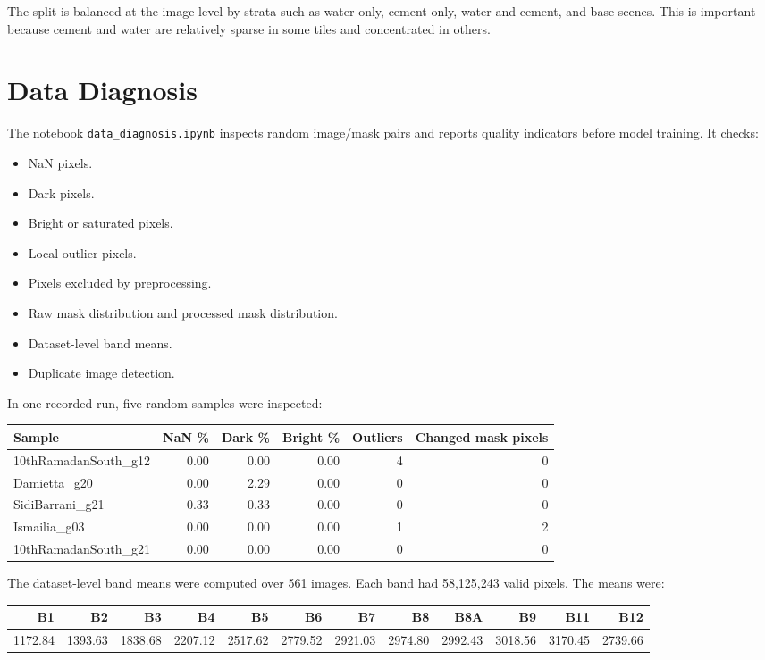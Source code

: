 \documentclass[11pt,a4paper]{article}
\begin{document}
The split is balanced at the image level by strata such as water-only, cement-only, water-and-cement, and base scenes. This is important because cement and water are relatively sparse in some tiles and concentrated in others.

\section{Data Diagnosis}

The notebook \texttt{data\_diagnosis.ipynb} inspects random image/mask pairs and reports quality indicators before model training. It checks:
\begin{itemize}[noitemsep]
  \item NaN pixels.
  \item Dark pixels.
  \item Bright or saturated pixels.
  \item Local outlier pixels.
  \item Pixels excluded by preprocessing.
  \item Raw mask distribution and processed mask distribution.
  \item Dataset-level band means.
  \item Duplicate image detection.
\end{itemize}

In one recorded run, five random samples were inspected:
\begin{center}
\begin{tabular}{lrrrrr}
\toprule
Sample & NaN \% & Dark \% & Bright \% & Outliers & Changed mask pixels \\
\midrule
10thRamadanSouth\_g12 & 0.00 & 0.00 & 0.00 & 4 & 0 \\
Damietta\_g20 & 0.00 & 2.29 & 0.00 & 0 & 0 \\
SidiBarrani\_g21 & 0.33 & 0.33 & 0.00 & 0 & 0 \\
Ismailia\_g03 & 0.00 & 0.00 & 0.00 & 1 & 2 \\
10thRamadanSouth\_g21 & 0.00 & 0.00 & 0.00 & 0 & 0 \\
\bottomrule
\end{tabular}
\end{center}

The dataset-level band means were computed over 561 images. Each band had 58,125,243 valid pixels. The means were:
\begin{center}
\begin{tabular}{rrrrrrrrrrrr}
\toprule
B1 & B2 & B3 & B4 & B5 & B6 & B7 & B8 & B8A & B9 & B11 & B12 \\
\midrule
1172.84 & 1393.63 & 1838.68 & 2207.12 & 2517.62 & 2779.52 & 2921.03 & 2974.80 & 2992.43 & 3018.56 & 3170.45 & 2739.66 \\
\bottomrule
\end{tabular}
\end{center}
\end{document}
